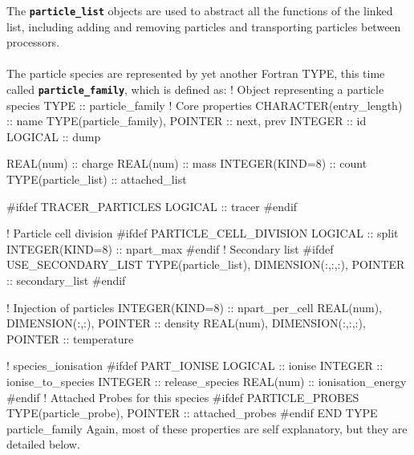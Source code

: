 \documentclass[12pt,a4paper]{article}
\newcommand{\inlinecode}[1]{{\color{warwickred} \bf\texttt{#1}}}
\newenvironment{boxverbatim}{\lboxverbatim{none}}{\endlboxverbatim}
\begin{document}
The \inlinecode{particle\_list} objects are used to abstract all the functions
of the linked list, including adding and removing particles and transporting
particles between processors.\\
\\
The particle species are represented by yet another Fortran TYPE, this time
called \inlinecode{particle\_family}, which is defined as:
\begin{boxverbatim}
  ! Object representing a particle species
  TYPE :: particle_family
    ! Core properties
    CHARACTER(entry_length) :: name
    TYPE(particle_family), POINTER :: next, prev
    INTEGER :: id
    LOGICAL :: dump

    REAL(num) :: charge
    REAL(num) :: mass
    INTEGER(KIND=8) :: count
    TYPE(particle_list) :: attached_list

#ifdef TRACER_PARTICLES
    LOGICAL :: tracer
#endif

    ! Particle cell division
#ifdef PARTICLE_CELL_DIVISION
    LOGICAL :: split
    INTEGER(KIND=8) :: npart_max
#endif
    ! Secondary list
#ifdef USE_SECONDARY_LIST
    TYPE(particle_list), DIMENSION(:,:,:), POINTER :: secondary_list
#endif

    ! Injection of particles
    INTEGER(KIND=8) :: npart_per_cell
    REAL(num), DIMENSION(:,:), POINTER :: density
    REAL(num), DIMENSION(:,:,:), POINTER :: temperature

    ! species_ionisation
#ifdef PART_IONISE
    LOGICAL :: ionise
    INTEGER :: ionise_to_species
    INTEGER :: release_species
    REAL(num) :: ionisation_energy
#endif
    ! Attached Probes for this species
#ifdef PARTICLE_PROBES
    TYPE(particle_probe), POINTER :: attached_probes
#endif
  END TYPE particle_family
\end{boxverbatim}
Again, most of these properties are self explanatory, but they are detailed
below.
\end{document}
